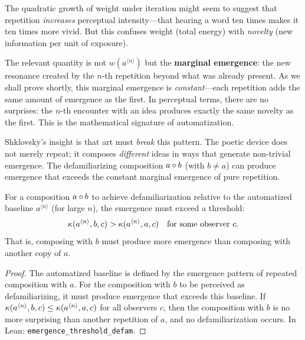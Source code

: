\begin{interpretation}
\label{interp:weight-iterate}
The quadratic growth of weight under iteration might seem to suggest that
repetition \emph{increases} perceptual intensity---that hearing a word ten
times makes it ten times more vivid.  But this confuses weight (total energy)
with \emph{novelty} (new information per unit of exposure).

The relevant quantity is not $w(a^{\langle n \rangle})$ but the \textbf{marginal
emergence}: the new resonance created by the $n$-th repetition beyond what
was already present.  As we shall prove shortly, this marginal emergence is
\emph{constant}---each repetition adds the same amount of emergence as the
first.  In perceptual terms, there are no surprises: the $n$-th encounter
with an idea produces exactly the same novelty as the first.  This is the
mathematical signature of automatization.

Shklovsky's insight is that art must \emph{break} this pattern.  The poetic
device does not merely repeat; it composes \emph{different} ideas in ways
that generate non-trivial emergence.  The defamiliarizing composition
$a \circ b$ (with $b \neq a$) can produce emergence that exceeds the
constant marginal emergence of pure repetition.
\end{interpretation}


\begin{theorem}
\label{thm:emergence-threshold}
For a composition $a \circ b$ to achieve defamiliarization relative to the automatized baseline $a^{\langle n \rangle}$ (for large $n$), the emergence must exceed a threshold:
\[
  \kappa(a^{\langle n \rangle}, b, c) > \kappa(a^{\langle n \rangle}, a, c) \quad \text{for some observer } c.
\]
That is, composing with $b$ must produce more emergence than composing with another copy of $a$.
\end{theorem}

\begin{proof}
The automatized baseline is defined by the emergence pattern of repeated composition with $a$.  For the composition with $b$ to be perceived as defamiliarizing, it must produce emergence that exceeds this baseline.  If $\kappa(a^{\langle n \rangle}, b, c) \leq \kappa(a^{\langle n \rangle}, a, c)$ for all observers $c$, then the composition with $b$ is no more surprising than another repetition of $a$, and no defamiliarization occurs.  In Lean: \texttt{emergence\_threshold\_defam}.
\end{proof}

